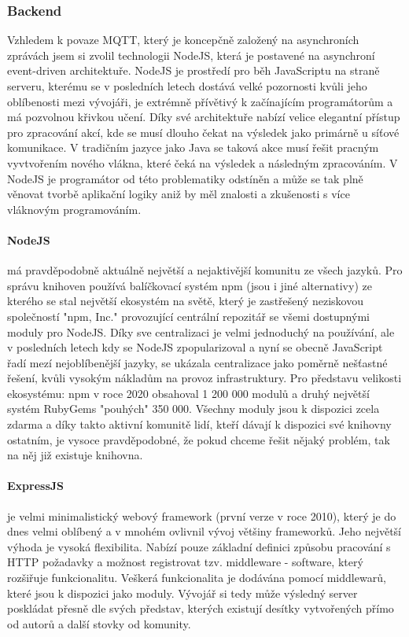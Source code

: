 \subsubsection{Backend}    %
Vzhledem k povaze MQTT, který je koncepčně založený na asynchroních zprávách jsem si zvolil technologii NodeJS, která je postavené na asynchroní event-driven architektuře. NodeJS je prostředí pro běh JavaScriptu na straně serveru, kterému se v posledních letech dostává velké pozornosti kvůli jeho oblíbenosti mezi vývojáři, je extrémně přívětivý k začínajícím programátorům a má pozvolnou křivkou učení. Díky své architektuře nabízí velice elegantní přístup pro zpracování akcí, kde se musí dlouho čekat na výsledek jako primárně u síťové komunikace. V tradičním jazyce jako Java se taková akce musí řešit pracným vyvtvořením nového vlákna, které čeká na výsledek a následným zpracováním. V NodeJS je programátor od této problematiky odstíněn a může se tak plně věnovat tvorbě aplikační logiky aniž by měl znalosti a zkušenosti s více vláknovým programováním.

\paragraph{NodeJS} má pravděpodobně aktuálně největší a nejaktivější komunitu ze všech jazyků. Pro správu knihoven používá balíčkovací systém npm (jsou i jiné alternativy) ze kterého se stal největší ekosystém na světě, který je zastřešený neziskovou společností "npm, Inc." provozující centrální repozitář se všemi dostupnými moduly pro NodeJS. Díky sve centralizaci je velmi jednoduchý na používání, ale v posledních letech kdy se NodeJS zpopularizoval a nyní se obecně JavaScript řadí mezí nejoblíbenější jazyky, se ukázala centralizace jako poměrně nešťastné řešení, kvůli vysokým nákladům na provoz infrastruktury. Pro představu velikosti ekosystému: npm v roce 2020 obsahoval 1 200 000 modulů a druhý největší systém RubyGems "pouhých" 350 000. Všechny moduly jsou k dispozici zcela zdarma a díky takto aktivní komunitě lidí, kteří dávají k dispozici své knihovny ostatním, je vysoce pravděpodobné, že pokud chceme řešit nějaký problém, tak na něj již existuje knihovna.

\paragraph{ExpressJS} je velmi minimalistický webový framework (první verze v roce 2010), který je do dnes velmi oblíbený a v mnohém ovlivnil vývoj většiny frameworků. Jeho největší výhoda je vysoká flexibilita. Nabízí pouze základní definici způsobu pracování s HTTP požadavky a možnost registrovat tzv. middleware - software, který rozšiřuje funkcionalitu. Veškerá funkcionalita je dodávána pomocí middlewarů, které jsou k dispozici jako moduly. Vývojář si tedy může výsledný server poskládat přesně dle svých představ, kterých existují desítky vytvořených přímo od autorů a další stovky od komunity.


